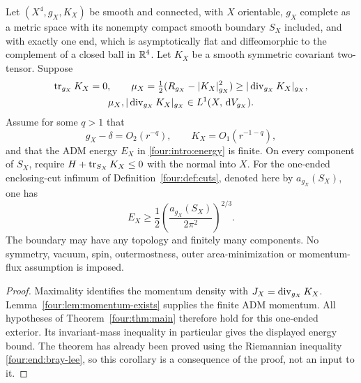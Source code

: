 \begin{corollary}
\label{four:cor:maximal-dec}\label{four:ass:energy}
Let $(X^4,g_X,K_X)$ be smooth and connected, with $X$ orientable,
$g_X$ complete as a metric space with its nonempty compact smooth
boundary $S_X$ included, and with exactly one end, which is asymptotically
flat and diffeomorphic to the complement of a closed ball in $\mathbb R^4$.
Let $K_X$ be a smooth symmetric covariant two-tensor. Suppose
\[
\begin{gathered}
 \operatorname{tr}_{g_X}K_X=0,\qquad
 \mu_X=\tfrac12(R_{g_X}-|K_X|_{g_X}^2)
       \ge|\operatorname{div}_{g_X}K_X|_{g_X},\\
 \mu_X,|\operatorname{div}_{g_X}K_X|_{g_X}\in L^1(X,\,\mathrm d V_{g_X}).
\end{gathered}
\]
Assume for some $q>1$ that
\[
 g_X-\delta=O_2(r^{-q}),\qquad K_X=O_1(r^{-1-q}),
\]
and that the ADM energy $E_X$ in \eqref{four:intro:energy} is finite.
On every component of $S_X$, require
$H+\operatorname{tr}_{S_X}K_X\le0$ with the normal into $X$.
For the one-ended enclosing-cut infimum of Definition~\ref{four:def:cuts},
denoted here by $a_{g_X}(S_X)$, one has
\[
 E_X\ge\frac12\left(\frac{a_{g_X}(S_X)}{2\pi^2}\right)^{2/3}.
\]
The boundary may have any topology and finitely many components.
No symmetry, vacuum, spin, outermostness, outer area-minimization
or momentum-flux assumption is imposed.
\end{corollary}

\begin{proof}
Maximality identifies the momentum density with
$J_X=\operatorname{div}_{g_X}K_X$. Lemma~\ref{four:lem:momentum-exists} supplies
the finite ADM momentum. All hypotheses of
Theorem~\ref{four:thm:main} therefore hold for this one-ended exterior.
Its invariant-mass inequality in particular gives the displayed
energy bound. The theorem has already been proved using the
Riemannian inequality \eqref{four:end:bray-lee}, so this corollary is
a consequence of the proof, not an input to it.
\end{proof}

